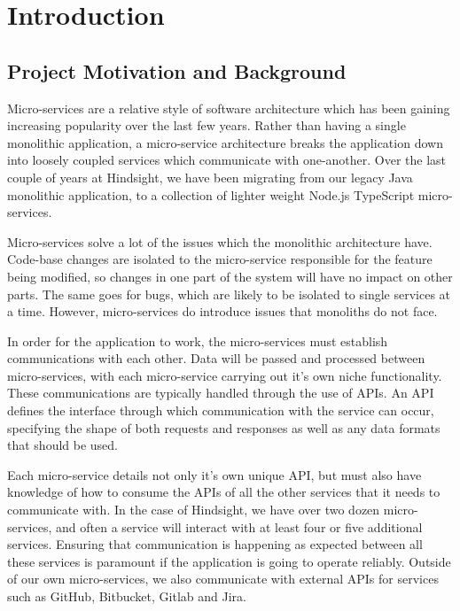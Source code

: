 \chapter{Introduction}
\section{Project Motivation and Background}

Micro-services are a relative style of software architecture which has been gaining increasing popularity over the last few years. Rather than having a single monolithic application, a micro-service architecture breaks the application down into loosely coupled services which communicate with one-another. Over the last couple of years at Hindsight, we have been migrating from our legacy Java monolithic application, to a collection of lighter weight Node.js TypeScript micro-services.

Micro-services solve a lot of the issues which the monolithic architecture have. Code-base changes are isolated to the micro-service responsible for the feature being modified, so changes in one part of the system will have no impact on other parts. The same goes for bugs, which are likely to be isolated to single services at a time. However, micro-services do introduce issues that monoliths do not face.

In order for the application to work, the micro-services must establish communications with each other. Data will be passed and processed between micro-services, with each micro-service carrying out it's own niche functionality. These communications are typically handled through the use of APIs. An API defines the interface through which communication with the service can occur, specifying the shape of both requests and responses as well as any data formats that should be used.

Each micro-service details not only it's own unique API, but must also have knowledge of how to consume the APIs of all the other services that it needs to communicate with. In the case of Hindsight, we have over two dozen micro-services, and often a service will interact with at least four or five additional services. Ensuring that communication is happening as expected between all these services is paramount if the application is going to operate reliably. Outside of our own micro-services, we also communicate with  external APIs for services such as GitHub, Bitbucket, Gitlab and Jira.

